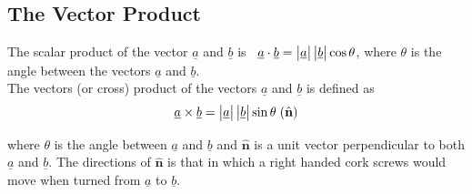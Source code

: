 \documentclass[11pt,a4paper]{article}
\begin{document}
\subsection{The Vector Product}

The scalar product of the vector $\underline{a}$ and $\underline{b}$ is $\hspace{0.2cm} \underline{a}\cdot \underline{b} = \begin{vmatrix}
\underline{a}\\
\end{vmatrix} \begin{vmatrix}
\underline{b}\\
\end{vmatrix}\cos \theta$, where $\theta$ is the angle between the vectors $\underline{a}$ and $\underline{b}$.\\

The vectors (or cross) product of the vectors $\underline{a}$ and $\underline{b}$ is defined as  
$$\underline{a}\times \underline{b} = \begin{vmatrix}
\underline{a}\\
\end{vmatrix} \begin{vmatrix}
\underline{b}\\
\end{vmatrix}\sin \theta\hspace{0.1cm}(\hat{\textbf{n}})$$

where $\theta$ is the angle between $\underline{a}$ and $\underline{b}$ and $\hat{\textbf{n}}$ is a unit vector perpendicular to both $\underline{a}$ and $\underline{b}$. The directions of $\hat{\textbf{n}}$ is that in which a right handed cork screws would move when turned from $\underline{a}$ to $\underline{b}$.




\begin{figure}[H]
\centering
{}
\end{figure}
\end{document}

